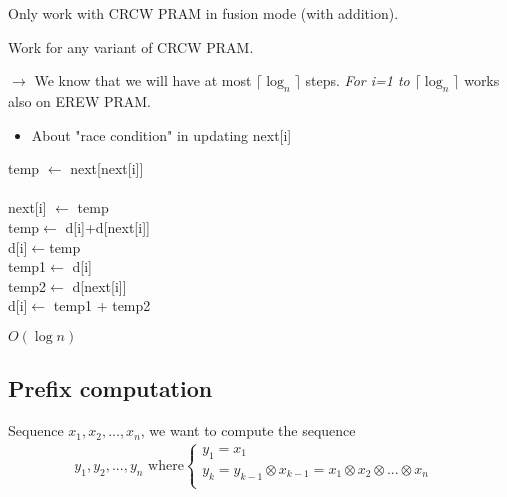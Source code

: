 Only work with CRCW PRAM in fusion mode (with addition).

\begin{algorithm}[H]
\end{algorithm}
Work for any variant of CRCW PRAM.

$\rightarrow$ We know that we will have at most $\lceil \log_n \rceil$ steps.
\textit{For i=1 to $\lceil \log_n \rceil$} works also on EREW PRAM.

\newpage
\begin{itemize}
\item About "race condition" in updating next[i]
\end{itemize}
\begin{algorithm}[H]
temp $\leftarrow$ next[next[i]]\\
\\
next[i] $\leftarrow$ temp\\
temp$\leftarrow$ d[i]+d[next[i]]\\
d[i]$\leftarrow$temp\\
temp1$\leftarrow$ d[i]\\
temp2$\leftarrow$ d[next[i]]\\
d[i]$\leftarrow$ temp1 + temp2\\
\end{algorithm}

 $O(\log n)$

\subsection{Prefix computation}
Sequence $x_1, x_2, ..., x_n$, we want to compute the sequence
\begin{align*}
y_1, y_2, ... ,y_n \text{ where}
\begin{cases}
y_1 = x_1 & \\
y_k=y_{k-1} \otimes x_{k-1} = x_1 \otimes x_2 \otimes ... \otimes x_n & \\
\end{cases}
\end{align*}

